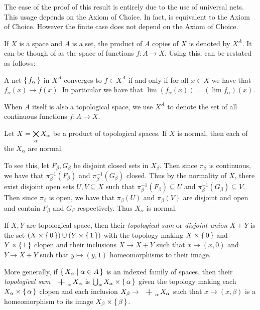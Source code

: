 \documentclass[letterpaper, 11pt, oneside]{book}
\begin{document}
The ease of the proof of this result is entirely due to the use of universal nets.
This usage depends on the Axiom of Choice.
In fact,  is equivalent to the Axiom of Choice.
However the finite case  does not depend on the Axiom of Choice.

If $X$ is a space and $A$ is a set, the product of $A$ copies of $X$ is denoted by $X^{A}$.
It can be though of as the space of functions $f\colon A \to X$.
Using this,  can be restated as follows:
\begin{prop}
  A net $\set{f_{\alpha}}$ in $X^{A}$ converges to $f \in X^{A}$ if and only if for all $x \in X$ we have that $f_{\alpha}(x) \to f(x)$.
  In particular we have that $\lim(f_{\alpha}(x)) = (\lim f_{\alpha})(x)$.
\end{prop}

When $A$ itself is also a topological space, we use $X^{A}$ to denote the set of all continuous functions $f\colon A \to X$.

\begin{prop}
  Let $X = \bigtimes\limits_{\alpha} X_{\alpha}$ be a product of topological spaces.
  If $X$ is normal, then each of the $X_{\alpha}$ are normal.

\end{prop}
\begin{pf}
  To see this, let $F_{\beta}, G_{\beta}$ be disjoint closed sets in $X_{\beta}$.
  Then since $\pi_{\beta}$ is continuous, we have that $\pi_{\beta}^{-1}(F_{\beta})$ and $\pi_{\beta}^{-1}(G_{\beta})$ closed.
  Thus by the normality of $X$, there exist disjoint open sets $U, V \subseteq X$ such that $\pi_{\beta}^{-1}(F_{\beta}) \subseteq U$ and $\pi_{\beta}^{-1}(G_{\beta}) \subseteq V$.
  Then since $\pi_{\beta}$ is open, we have that $\pi_{\beta}(U)$ and $\pi_{\beta}(V)$ are disjoint and open and contain $F_{\beta}$ and $G_{\beta}$ respectively.
  Thus $X_{\alpha}$ is normal.
\end{pf}

\clearpage


\clearpage

\begin{defn}
  If $X, Y$ are topological space, then their \emph{topological sum} or \emph{disjoint union} $X + Y$ is the set $(X \times \set{0}) \cup (Y \times \set{1})$ with the topology making $X \times \set{0}$ and $Y \times \set{1}$ clopen and their inclusions $X \to X + Y$ such that $x \mapsto (x, 0)$ and $Y \to X + Y$ such that $y \mapsto (y, 1)$ homeomorphisms to their image.

  More generally, if $\set{X_{\alpha} | \alpha \in A}$ is an indexed family of spaces, then their \emph{topological sum} $\bigplus_{\alpha} X_{\alpha}$ is $\bigcup_{\alpha} X_{\alpha} \times \set{\alpha}$ given the topology making each $X_{\alpha} \times \set{\alpha}$ clopen and each inclusion $X_{\beta} \to \bigplus_{\alpha} X_{\alpha}$ such that $x \to (x, \beta)$ is a homeomorphism to its image $X_{\beta} \times \set{\beta}$.
\end{defn}
\end{document}
